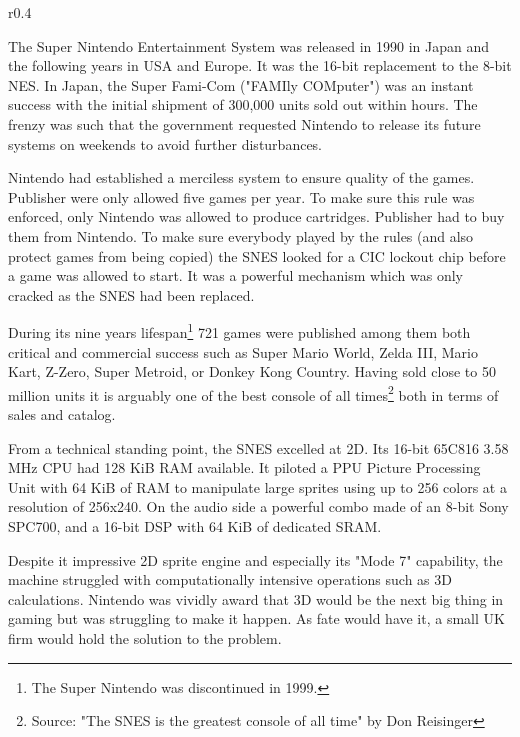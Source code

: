 \begin{wrapfigure}[3]{r}{0.4\textwidth}{
\centering {}}
\end{wrapfigure}
The Super Nintendo Entertainment System was released in 1990 in Japan and the following years in USA and Europe. It was the 16-bit replacement to the 8-bit NES. In Japan, the Super Fami-Com ("FAMIly COMputer") was an instant success with the initial shipment of 300,000 units sold out within hours. The frenzy was such that the government requested Nintendo to release its future systems on weekends to avoid further disturbances.\\
\par
Nintendo had established a merciless system to ensure quality of the games. Publisher were only allowed five games per year. To make sure this rule was enforced, only Nintendo was allowed to produce cartridges. Publisher had to buy them from Nintendo. To make sure everybody played by the rules (and also protect games from being copied) the SNES looked for a CIC lockout chip before a game was allowed to start. It was a powerful mechanism which was only cracked as the SNES had been replaced.\\
\par
During its nine years lifespan\footnote{The Super Nintendo was discontinued in 1999.} 721 games were published among them both critical and commercial success such as Super Mario World, Zelda III, Mario Kart, Z-Zero, Super Metroid, or Donkey Kong Country. Having sold close to 50 million units it is arguably one of the best console of all times\footnote{Source: "The SNES is the greatest console of all time" by Don Reisinger} both in terms of sales and catalog.\\
\par
{}
\par
From a technical standing point, the SNES excelled at 2D. Its 16-bit 65C816 3.58 MHz CPU had 128 KiB RAM available. It piloted a PPU Picture Processing Unit with 64 KiB of RAM to manipulate large sprites using up to 256 colors at a resolution of 256x240. On the audio side a powerful combo made of an 8-bit Sony SPC700, and a 16-bit DSP with 64 KiB of dedicated SRAM.\\
\par

Despite it impressive 2D sprite engine and especially its "Mode 7" capability, the machine struggled with computationally intensive operations such as 3D calculations. Nintendo was vividly award that 3D would be the next big thing in gaming but was struggling to make it happen. As fate would have it, a small UK firm would hold the solution to the problem.\\

